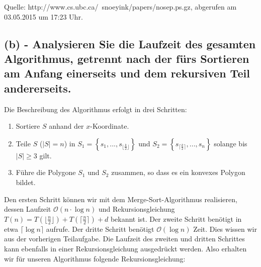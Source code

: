 \documentclass[a4paper]{article}
\begin{document}
Quelle: http://www.cs.ubc.ca/~snoeyink/papers/nosep.ps.gz, abgerufen am 03.05.2015 um 17:23 Uhr. 

\subsection*{(b) - Analysieren Sie die Laufzeit des gesamten Algorithmus, getrennt nach der fürs Sortieren am Anfang einerseits und dem rekursiven Teil andererseits. }

Die Beschreibung des Algorithmus erfolgt in drei Schritten:

\begin{enumerate}

\item Sortiere $S$ anhand der $x$-Koordinate.

\item Teile $S$ ($|S| = n$) in $S_1 = \left\{s_1, ..., s_{\lfloor \frac{k}{2} \rfloor } \right\}$ und $S_2 = \left\{s_{ \lceil \frac{k}{2} \rceil}, ..., s_n \right\}$ solange bis $|S| \geq 3$ gilt.

\item Führe die Polygone $S_1$ und $S_2$ zusammen, so dass es ein konvexes Polygon bildet.

\end{enumerate}

Den ersten Schritt können wir mit dem Merge-Sort-Algorithmus realisieren, dessen Laufzeit $\mathcal{O}(n \cdot \log n)$ und Rekursionsgleichung $T(n) = T(\lfloor \frac{n}{2} \rfloor) + T(\lceil \frac{n}{2} \rceil) + d$ bekannt ist.
Der zweite Schritt benötigt in etwa $\lceil \log n \rceil$ aufrufe. Der dritte Schritt benötigt $\mathcal{O}(\log n)$ Zeit. Dies wissen wir aus der vorherigen Teilaufgabe. Die Laufzeit des zweiten und dritten Schrittes kann ebenfalls in einer Rekursionsgleichung ausgedrückt werden. Also erhalten wir für unseren Algorithmus folgende Rekursionsgleichung:
\end{document}
